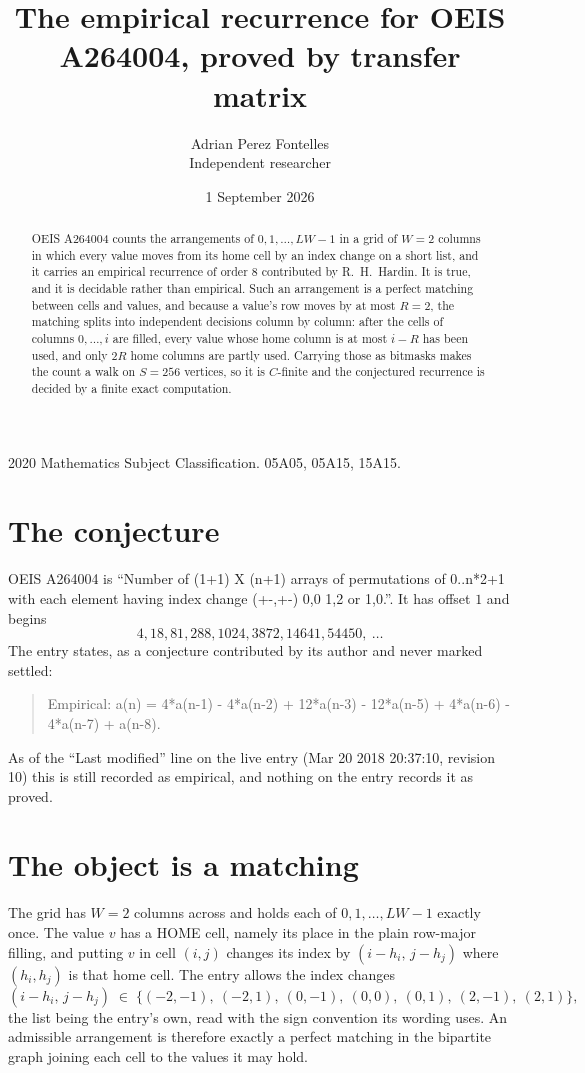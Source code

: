 \documentclass[11pt,a4paper]{article}
\title{The empirical recurrence for OEIS A264004, proved by transfer matrix}
\author{Adrian Perez Fontelles\\ \small Independent researcher}
\date{1 September 2026}
\theoremstyle{plain}
\theoremstyle{definition}
\begin{document}
\maketitle

\begin{abstract}
OEIS A264004 counts the arrangements of $0,1,\dots,LW-1$ in a grid of $W=2$ columns in which
every value moves from its home cell by an index change on a short list, and it carries an
empirical recurrence of order $8$ contributed by R.~H.~Hardin. It is true, and it is
decidable rather than empirical. Such an arrangement is a perfect matching between cells and
values, and because a value's row moves by at most $R=2$, the matching splits into
independent decisions column by column: after the cells of columns $0,\dots,i$ are filled,
every value whose home column is at most $i-R$ has been used, and only $2R$ home columns are
partly used. Carrying those as bitmasks makes the count a walk on $S=256$ vertices, so it is
$C$-finite and the conjectured recurrence is decided by a finite exact computation.
\end{abstract}

\noindent\small 2020 Mathematics Subject Classification. 05A05, 05A15, 15A15.\normalsize

\section{The conjecture}

OEIS A264004 is ``Number of (1+1) X (n+1) arrays of permutations of 0..n*2+1 with each element having index change (+-,+-) 0,0 1,2 or 1,0.''. It has offset $1$ and begins
\[
4, 18, 81, 288, 1024, 3872, 14641, 54450,\ \dots
\]
The entry states, as a conjecture contributed by its author and never marked settled:
\begin{quote}
Empirical: a(n) = 4*a(n-1) - 4*a(n-2) + 12*a(n-3) - 12*a(n-5) + 4*a(n-6) - 4*a(n-7) + a(n-8).
\end{quote}
As of the ``Last modified'' line on the live entry (Mar 20 2018 20:37:10, revision 10) this is still
recorded as empirical, and nothing on the entry records it as proved.

\section{The object is a matching}

The grid has $W=2$ columns across and holds each of $0,1,\dots,LW-1$ exactly once. The value
$v$ has a HOME cell, namely its place in the plain row-major filling, and putting $v$ in cell
$(i,j)$ changes its index by $(i-h_i,\,j-h_j)$ where $(h_i,h_j)$ is that home cell. The entry
allows the index changes
\[
(i-h_i,\,j-h_j)\;\in\;\{(-2,-1),\ (-2,1),\ (0,-1),\ (0,0),\ (0,1),\ (2,-1),\ (2,1)\},
\]
the list being the entry's own, read with the sign convention its wording uses. An admissible
arrangement is therefore exactly a perfect matching in the bipartite graph joining each cell to
the values it may hold.
\end{document}
